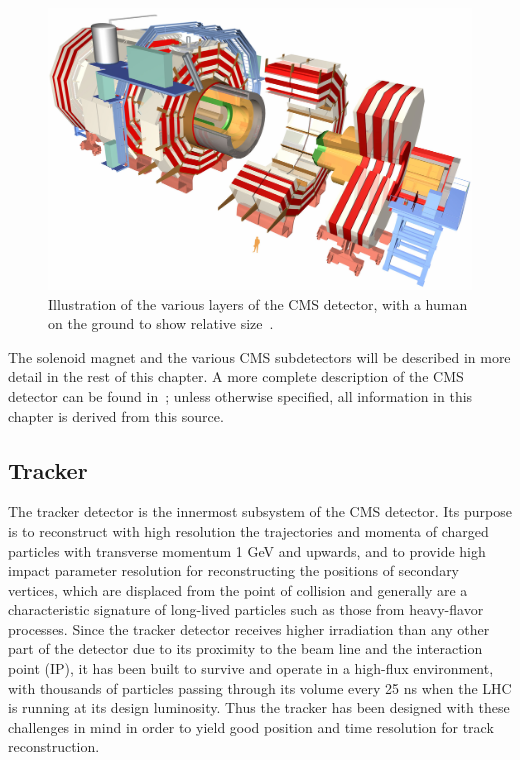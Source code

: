 \begin{figure}[hbtp]
  \begin{center}
    \includegraphics[width=2.0\cmsFigWidth]{figures/wholeCMS3D}
    \caption{Illustration of the various layers of the CMS detector, with a human on the ground to show relative size~\cite{CMSimage}.}
    \label{fig:cms}
  \end{center}
\end{figure}

The solenoid magnet and the various CMS subdetectors will be described in more detail in the rest of this chapter. A more complete description of the CMS detector can be found in~\cite{1748-0221-3-08-S08004}; unless otherwise specified, all information in this chapter is derived from this source.

\subsection{Tracker\label{sec:cms-tracker}}

The tracker detector is the innermost subsystem of the CMS detector. Its purpose is to reconstruct with high resolution the trajectories and momenta of charged particles with transverse momentum 1 GeV and upwards, and to provide high impact parameter resolution for reconstructing the positions of secondary vertices, which are displaced from the point of collision and generally are a characteristic signature of long-lived particles such as those from heavy-flavor processes. Since the tracker detector receives higher irradiation than any other part of the detector due to its proximity to the beam line and the interaction point (IP), it has been built to survive and operate in a high-flux environment, with thousands of particles passing through its volume every 25 ns when the LHC is running at its design luminosity. Thus the tracker has been designed with these challenges in mind in order to yield good position and time resolution for track reconstruction.

